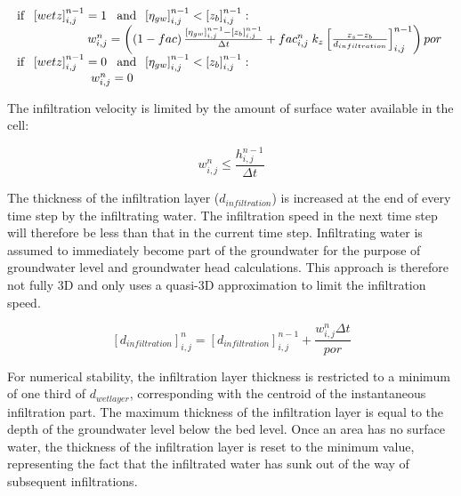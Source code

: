 \begin{equation} \label{2.88)} 
\begin{array}{l} {{\rm \; if\; \; }\left[wetz\right]_{i,j}^{n-1} =1{\rm \; \; \; and\; \; }\left[\eta _{gw} \right]_{i,j}^{n-1} <\left[z_{b} \right]_{i,j}^{n-1} :} \\ {{\rm \; \; \; \; \; \; \; \; \; \; \; \; \; \; \; \; \; \; \; \; \; \; }w_{i,j}^{n} =\left(\left(1-fac\right)\frac{\left[\eta _{gw} \right]_{i,j}^{n-1} -\left[z_{b} \right]_{i,j}^{n-1} }{\Delta t} +fac_{i,j}^{n} {\rm \; }k_{z} \left[\frac{z_{s} -z_{b} }{d_{infiltration} } \right]_{i,j}^{n-1} \right)por{\rm \; \; }} \\ {{\rm \; if\; \; }\left[wetz\right]_{i,j}^{n-1} =0{\rm \; \; \; and\; \; }\left[\eta _{gw} \right]_{i,j}^{n-1} <\left[z_{b} \right]_{i,j}^{n-1} :} \\ {{\rm \; \; \; \; \; \; \; \; \; \; \; \; \; \; \; \; \; \; \; \; \; \; \; }w_{i,j}^{n} =0} \end{array} 
\end{equation} 

The infiltration velocity is limited by the amount of surface water available in the cell:

\begin{equation} \label{2.89)} 
w_{i,j}^{n} \le \frac{h_{i,j}^{n-1} }{\Delta t}  
\end{equation} 

The thickness of the infiltration layer ($d_{infiltration} $) is increased at the end of every time step by the infiltrating water. The infiltration speed in the next time step will therefore be less than that in the current time step. Infiltrating water is assumed to immediately become part of the groundwater for the purpose of groundwater level and groundwater head calculations. This approach is therefore not fully 3D and only uses a quasi-3D approximation to limit the infiltration speed.

\begin{equation} \label{2.90)} 
\left[d_{infiltration} \right]_{i,j}^{n} =\left[d_{infiltration} \right]_{i,j}^{n-1} +\frac{w_{i,j}^{n} \Delta t}{por}  
\end{equation} 

For numerical stability, the infiltration layer thickness is restricted to a minimum of one third of $d_{wetlayer} $, corresponding with the centroid of the instantaneous infiltration part. The maximum thickness of the infiltration layer is equal to the depth of the groundwater level below the bed level. Once an area has no surface water, the thickness of the infiltration layer is reset to the minimum value, representing the fact that the infiltrated water has sunk out of the way of subsequent infiltrations.

